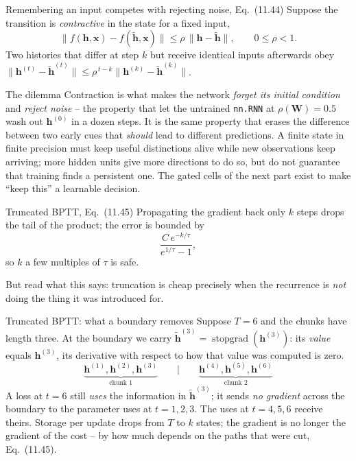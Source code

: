 \documentclass[10pt,aspectratio=169]{beamer}
\begin{document}
\begin{frame}{Remembering an input competes with rejecting noise, Eq.~(11.44)}
Suppose the transition is \emph{contractive} in the state for a fixed input,
\[
  \|f(\bm{h},\bm{x})-f(\tilde{\bm{h}},\bm{x})\|\le\rho\,\|\bm{h}-\tilde{\bm{h}}\|,\qquad 0\le\rho<1 .
\]
Two histories that differ at step $k$ but receive identical inputs
afterwards obey $\|\bm{h}^{(t)}-\tilde{\bm{h}}^{(t)}\|\le\rho^{\,t-k}\|\bm{h}^{(k)}-\tilde{\bm{h}}^{(k)}\|$.
\begin{block}{The dilemma}
Contraction is what makes the network \emph{forget its initial condition}
and \emph{reject noise} -- the property that let the untrained
\texttt{nn.RNN} at $\rho(\bm{W})=0.5$ wash out $\bm{h}^{(0)}$ in a dozen
steps.  It is the same property that erases the difference between two early
cues that \emph{should} lead to different predictions.  A finite state in
finite precision must keep useful distinctions alive while new observations
keep arriving; more hidden units give more directions to do so, but do not
guarantee that training finds a persistent one.  The gated cells of the
next part exist to make ``keep this'' a learnable decision.
\end{block}
\end{frame}


\begin{frame}{Truncated BPTT, Eq.~(11.45)}
Propagating the gradient back only $k$ steps drops the tail of the
product; the error is bounded by
\[
  \frac{C\,e^{-k/\tau}}{e^{1/\tau}-1},
\]
so $k$ a few multiples of $\tau$ is safe.

\medskip
But read what this says: truncation is cheap precisely when the recurrence
is \emph{not} doing the thing it was introduced for.
\end{frame}

\begin{frame}{Truncated BPTT: what a boundary removes}
Suppose $T=6$ and the chunks have length three.  At the boundary we carry
$\tilde{\bm{h}}^{(3)}=\operatorname{stopgrad}(\bm{h}^{(3)})$: its \emph{value}
equals $\bm{h}^{(3)}$, its derivative with respect to how that value was
computed is zero.
\[
  \underbrace{\bm{h}^{(1)},\bm{h}^{(2)},\bm{h}^{(3)}}_{\text{chunk 1}}
  \qquad\Big|\qquad
  \underbrace{\bm{h}^{(4)},\bm{h}^{(5)},\bm{h}^{(6)}}_{\text{chunk 2}}
\]
A loss at $t=6$ still \emph{uses} the information in $\tilde{\bm{h}}^{(3)}$;
it sends \emph{no gradient} across the boundary to the parameter uses at
$t=1,2,3$.  The uses at $t=4,5,6$ receive theirs.  Storage per update drops
from $T$ to $k$ states; the gradient is no longer the gradient of the cost
-- by how much depends on the paths that were cut, Eq.~(11.45).
\end{frame}
\end{document}

